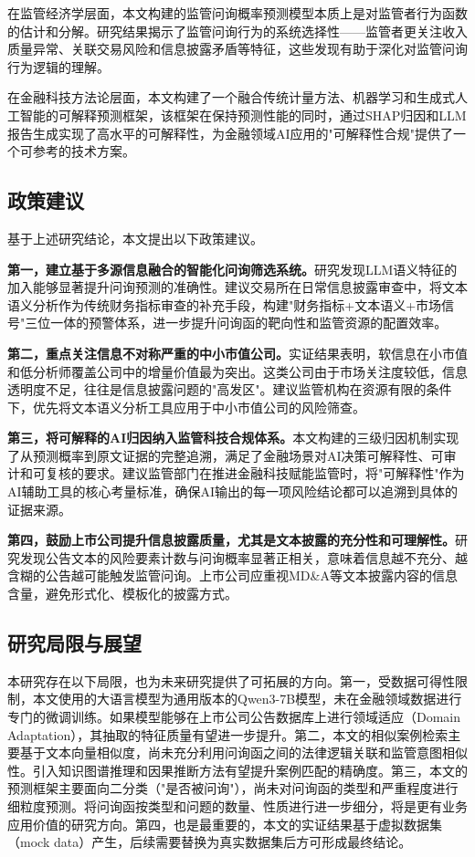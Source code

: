 在监管经济学层面，本文构建的监管问询概率预测模型本质上是对监管者行为函数的估计和分解。研究结果揭示了监管问询行为的系统选择性——监管者更关注收入质量异常、关联交易风险和信息披露矛盾等特征，这些发现有助于深化对监管问询行为逻辑的理解。

在金融科技方法论层面，本文构建了一个融合传统计量方法、机器学习和生成式人工智能的可解释预测框架，该框架在保持预测性能的同时，通过SHAP归因和LLM报告生成实现了高水平的可解释性，为金融领域AI应用的"可解释性合规"提供了一个可参考的技术方案。

\subsection{政策建议}

基于上述研究结论，本文提出以下政策建议。

\textbf{第一，建立基于多源信息融合的智能化问询筛选系统。}研究发现LLM语义特征的加入能够显著提升问询预测的准确性。建议交易所在日常信息披露审查中，将文本语义分析作为传统财务指标审查的补充手段，构建"财务指标+文本语义+市场信号"三位一体的预警体系，进一步提升问询函的靶向性和监管资源的配置效率。

\textbf{第二，重点关注信息不对称严重的中小市值公司。}实证结果表明，软信息在小市值和低分析师覆盖公司中的增量价值最为突出。这类公司由于市场关注度较低，信息透明度不足，往往是信息披露问题的"高发区"。建议监管机构在资源有限的条件下，优先将文本语义分析工具应用于中小市值公司的风险筛查。

\textbf{第三，将可解释的AI归因纳入监管科技合规体系。}本文构建的三级归因机制实现了从预测概率到原文证据的完整追溯，满足了金融场景对AI决策可解释性、可审计和可复核的要求。建议监管部门在推进金融科技赋能监管时，将"可解释性"作为AI辅助工具的核心考量标准，确保AI输出的每一项风险结论都可以追溯到具体的证据来源。

\textbf{第四，鼓励上市公司提升信息披露质量，尤其是文本披露的充分性和可理解性。}研究发现公告文本的风险要素计数与问询概率显著正相关，意味着信息越不充分、越含糊的公告越可能触发监管问询。上市公司应重视MD\&A等文本披露内容的信息含量，避免形式化、模板化的披露方式。

\subsection{研究局限与展望}

本研究存在以下局限，也为未来研究提供了可拓展的方向。第一，受数据可得性限制，本文使用的大语言模型为通用版本的Qwen3-7B模型，未在金融领域数据进行专门的微调训练。如果模型能够在上市公司公告数据库上进行领域适应（Domain Adaptation），其抽取的特征质量有望进一步提升。第二，本文的相似案例检索主要基于文本向量相似度，尚未充分利用问询函之间的法律逻辑关联和监管意图相似性。引入知识图谱推理和因果推断方法有望提升案例匹配的精确度。第三，本文的预测框架主要面向二分类（"是否被问询"），尚未对问询函的类型和严重程度进行细粒度预测。将问询函按类型和问题的数量、性质进行进一步细分，将是更有业务应用价值的研究方向。第四，也是最重要的，本文的实证结果基于虚拟数据集（mock data）产生，后续需要替换为真实数据集后方可形成最终结论。
